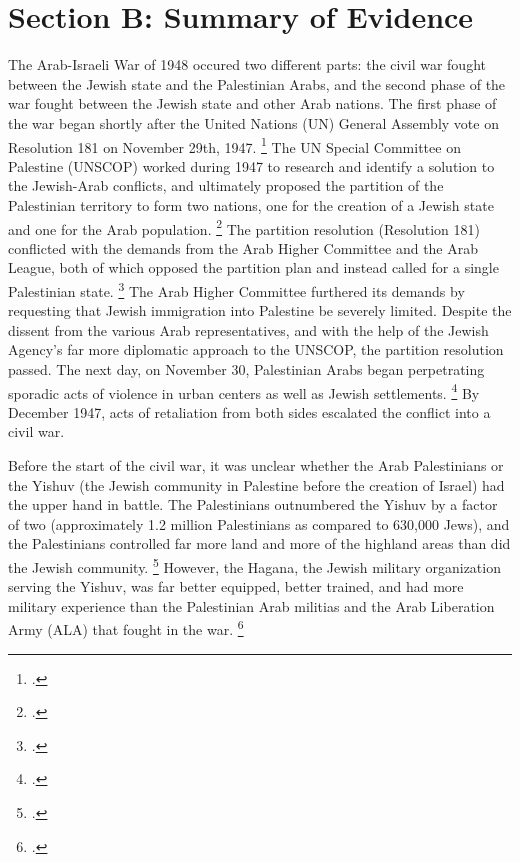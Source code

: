 \documentclass[12pt]{turabian-researchpaper}
\begin{document}
\section{Section B: Summary of Evidence}
The Arab-Israeli War of 1948 occured two different parts: the civil war fought between the Jewish state and the Palestinian Arabs, and the second phase of the war fought between the Jewish state and other Arab nations.  The first phase of the war began shortly after the United Nations (UN) General Assembly vote on Resolution 181 on November 29th, 1947.
\footcite[][]{tal}
The UN Special Committee on Palestine (UNSCOP) worked during 1947 to research and identify a solution to the Jewish-Arab conflicts, and ultimately proposed the partition of the Palestinian territory to form two nations, one for the creation of a Jewish state and one for the Arab population.
\footcite[][22]{pappe}
The partition resolution (Resolution 181) conflicted with the demands from the Arab Higher Committee and the Arab League, both of which opposed the partition plan and instead called for a single Palestinian state.
\footcite[][23]{pappe}
The Arab Higher Committee furthered its demands by requesting that Jewish immigration into Palestine be severely limited.  Despite the dissent from the various Arab representatives, and with the help of the Jewish Agency's far more diplomatic approach to the UNSCOP, the partition resolution passed.  The next day, on November 30, Palestinian Arabs began perpetrating sporadic acts of violence in urban centers as well as Jewish settlements.
\footcite[][77]{morris}
By December 1947, acts of retaliation from both sides escalated the conflict into a civil war.



Before the start of the civil war, it was unclear whether the Arab Palestinians or the Yishuv (the Jewish community in Palestine before the creation of Israel) had the upper hand in battle.  The Palestinians outnumbered the Yishuv by a factor of two (approximately 1.2 million Palestinians as compared to 630,000 Jews), and the Palestinians controlled far more land and more of the highland areas than did the Jewish community.
\footcite[][30]{bartal}
However, the Hagana, the Jewish military organization serving the Yishuv, was far better equipped, better trained, and had more military experience than the Palestinian Arab militias and the Arab Liberation Army (ALA) that fought in the war.
\footcite[][81]{morris}
\end{document}
